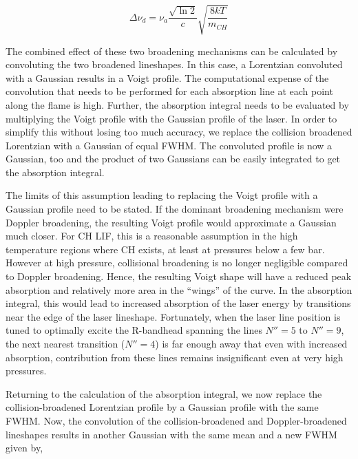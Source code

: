 \begin{equation}
  \Delta\nu_d = \nu_a \frac{\sqrt{ \ln 2 } }{c} \sqrt{\frac{8kT}{m_{CH}}}
  \label{eqn:dopplerBroadening}
\end{equation}


The combined effect of these two broadening mechanisms can be calculated by convoluting the two broadened lineshapes.
In this case, a Lorentzian convoluted with a Gaussian results in a Voigt profile.
The computational expense of the convolution that needs to be performed for each absorption line at each point along the flame is high.
Further, the absorption integral needs to be evaluated by multiplying the Voigt profile with the Gaussian profile of the laser.
In order to simplify this without losing too much accuracy, we replace the collision broadened Lorentzian with a Gaussian of equal FWHM.
The convoluted profile is now a Gaussian, too and the product of two Gaussians can be easily integrated to get the absorption integral.

The limits of this assumption leading to replacing the Voigt profile with a Gaussian profile need to be stated.
If the dominant broadening mechanism were Doppler broadening, the resulting Voigt profile would approximate a Gaussian much closer.
For CH LIF, this is a reasonable assumption in the high temperature regions where CH exists, at least at pressures below a few bar.
However at high pressure, collisional broadening is no longer negligible compared to Doppler broadening.
Hence, the resulting Voigt shape will have a reduced peak absorption and relatively more area in the ``wings'' of the curve.
In the absorption integral, this would lead to increased absorption of the laser energy by transitions near the edge of the laser lineshape.
Fortunately, when the laser line position is tuned to optimally excite the R-bandhead spanning the lines \(N''=5\) to \(N''=9\), the next nearest transition (\(N''=4\)) is far enough away that even with increased absorption, contribution from these lines remains insignificant even at very high pressures.

Returning to the calculation of the absorption integral, we now replace the collision-broadened Lorentzian profile by a Gaussian profile with the same FWHM.
Now, the convolution of the collision-broadened and Doppler-broadened lineshapes results in another Gaussian with the same mean and a new FWHM given by,

